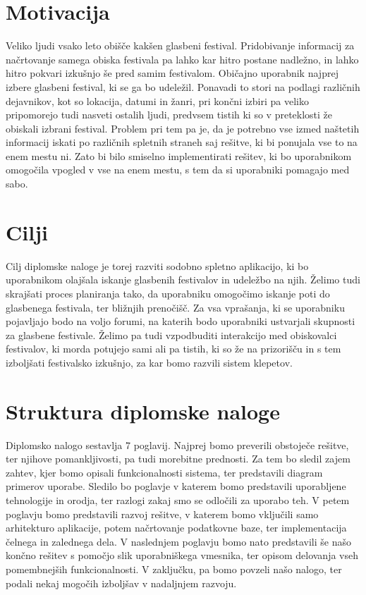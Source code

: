 \documentclass[a4paper,12pt,openright]{book}
\begin{document}
\section{Motivacija}
Veliko ljudi vsako leto obišče kakšen glasbeni festival.
Pridobivanje informacij za načrtovanje samega obiska festivala pa lahko kar hitro postane nadležno, in lahko hitro pokvari izkušnjo še pred samim festivalom.
Običajno uporabnik najprej izbere glasbeni festival, ki se ga bo udeležil.
Ponavadi to stori na podlagi različnih dejavnikov, kot so lokacija, datumi in žanri, pri končni izbiri pa veliko pripomorejo tudi nasveti ostalih ljudi, predvsem tistih ki so v preteklosti že obiskali izbrani festival.
Problem pri tem pa je, da je potrebno vse izmed naštetih informacij iskati po različnih spletnih straneh saj rešitve, ki bi ponujala vse to na enem mestu ni. 
Zato bi bilo smiselno implementirati rešitev, ki bo uporabnikom omogočila vpogled v vse na enem mestu, s tem da si uporabniki pomagajo med sabo.

\section{Cilji}
Cilj diplomske naloge je torej razviti sodobno spletno aplikacijo, ki bo uporabnikom olajšala iskanje glasbenih festivalov in udeležbo na njih.
Želimo tudi skrajšati proces planiranja tako, da uporabniku omogočimo iskanje poti do glasbenega festivala, ter bližnjih prenočišč.
Za vsa vprašanja, ki se uporabniku pojavljajo bodo na voljo forumi, na katerih bodo uporabniki ustvarjali skupnosti za glasbene festivale.
Želimo pa tudi vzpodbuditi interakcijo med obiskovalci festivalov, ki morda potujejo sami ali pa tistih, ki so že na prizorišču in s tem izboljšati festivalsko izkušnjo, za kar bomo razvili sistem klepetov.

\section{Struktura diplomske naloge}
Diplomsko nalogo sestavlja 7 poglavij.
Najprej bomo preverili obstoječe rešitve, ter njihove pomankljivosti, pa tudi morebitne prednosti.
Za tem bo sledil zajem zahtev, kjer bomo opisali funkcionalnosti sistema, ter predstavili diagram primerov uporabe.
Sledilo bo poglavje v katerem bomo predstavili uporabljene tehnologije in orodja, ter razlogi zakaj smo se odločili za uporabo teh.
V petem poglavju bomo predstavili razvoj rešitve, v katerem bomo vključili samo arhitekturo aplikacije, potem načrtovanje podatkovne baze, ter implementacija čelnega in zalednega dela.
V naslednjem poglavju bomo nato predstavili še našo končno rešitev s pomočjo slik uporabniškega vmesnika, ter opisom delovanja vseh pomembnejših funkcionalnosti.
V zaključku, pa bomo povzeli našo nalogo, ter podali nekaj mogočih izboljšav v nadaljnjem razvoju.
\end{document}
